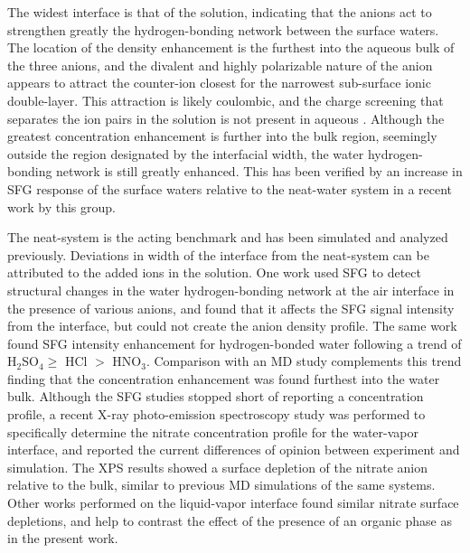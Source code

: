 
The widest interface is that of the \sodsul solution, indicating that the \sul anions act to strengthen greatly the hydrogen-bonding network between the surface waters. The location of the \sul density enhancement is the furthest into the aqueous bulk of the three anions,  and the divalent and highly polarizable nature of the anion appears to attract the counter-ion closest for the narrowest sub-surface ionic double-layer. This attraction is likely coulombic, and the charge screening that separates the ion pairs in the \sodnit solution is not present in aqueous \sodsul. Although the greatest concentration enhancement is further into the bulk region, seemingly outside the region designated by the interfacial width, the water hydrogen-bonding network is still greatly enhanced. This has been verified by an increase in SFG response of the surface waters relative to the neat-water system in a recent work by this group.\cite{McFearin2009}


The neat-\airwat system is the acting benchmark and has been simulated and analyzed previously.\cite{Wick2006c,Hore2008,Wick2008a} Deviations in width of the interface from the neat-\ctcwat system can be attributed to the added ions in the solution. One work used SFG to detect structural changes in the water hydrogen-bonding network at the air interface in the presence of various anions, and found that it affects the SFG signal intensity from the interface, but could not create the anion density profile\cite{Schnitzer2000}. The same work found SFG intensity enhancement for hydrogen-bonded water following a trend of H$_2$SO$_4\ge$ HCl $>$ HNO$_3$. Comparison with an \airwat MD study complements this trend finding that the \sul concentration enhancement was found furthest into the water bulk.\cite{Salvador2003} Although the SFG studies stopped short of reporting a concentration profile, a recent X-ray photo-emission spectroscopy study was performed to specifically determine the nitrate concentration profile for the water-vapor interface, and reported the current differences of opinion between experiment and simulation.\cite{Brown2009} The XPS results showed a surface depletion of the nitrate anion relative to the bulk, similar to previous MD simulations of the same systems. Other works performed on the liquid-vapor interface found similar nitrate surface depletions,\cite{Otten2007} and help to contrast the effect of the presence of an organic phase as in the present work. 


